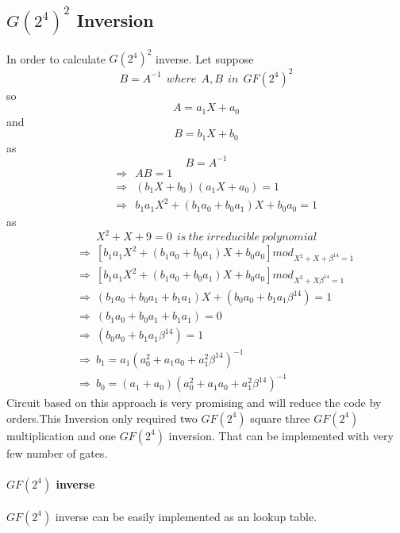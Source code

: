 \documentclass[10pt, conference, compsocconf]{IEEEtran}
\begin{document}
\subsection {$G(2^4)^2$ Inversion}
In order to calculate $G(2^4)^2$ inverse. Let suppose
\begin{equation}
B =  A^{-1}~~ where~~ A,B~~  in ~~GF(2^4)^2
\end{equation}
so
\begin{equation}
A = a_1 X + a_0
\end{equation}
and
\begin{equation}
B = b_1 X + b_0
\end{equation}
as
\begin{equation}
B = A^{-1}
\end{equation}
\begin{eqnarray}
&&\Rightarrow ~~AB = 1 \nonumber\\
&&\Rightarrow ~~(b_1 X + b_0)(a_1 X + a_0) = 1 \nonumber\\
&&\Rightarrow ~~b_1 a_1 X^2 + (b_1 a_0+b_0 a_1)X + b_0 a_0 = 1
\end{eqnarray}
as
\begin{equation}
X^2 + X + 9 = 0 ~~is~ the~ irreducible~ polynomial \nonumber
\end{equation}
\begin{eqnarray}
&&\Rightarrow ~[b_1 a_1 X^2 + (b_1 a_0+b_0 a_1)X + b_0 a_0] mod_{X^2 + X + \beta^{14} = 1} \nonumber\\
&&\Rightarrow ~[b_1 a_1 X^2 + (b_1 a_0+b_0 a_1)X + b_0 a_0] mod_{X^2 + X  \beta^{14} = 1} \nonumber\\
&&\Rightarrow ~(b_1 a_0+b_0 a_1 + b_1 a_1)X + (b_0 a_0 + b_1 a_1 \beta^{14} )= 1 \nonumber\\
&&\Rightarrow ~(b_1 a_0+b_0 a_1 + b_1 a_1)= 0  \nonumber\\
&&\Rightarrow ~(b_0 a_0 + b_1 a_1 \beta^{14} )= 1  \nonumber\\
&&\Rightarrow ~b_1 = a_1 (a_0^2 + a_1 a_0 +a_1^2 \beta^{14} )^{-1}  \\
&&\Rightarrow ~b_0 = (a_1 + a_0) (a_0^2 + a_1 a_0 +a_1^2 \beta^{14} )^{-1}
\end{eqnarray}
Circuit based on this approach is very promising and will reduce the code by orders.This Inversion only required  two $GF(2^4)$ square three $GF(2^4)$ multiplication and one $GF(2^4)$ inversion. That can be implemented with very few number of gates.

\paragraph{$GF(2^4)$ inverse}
$GF(2^4)$ inverse can be easily implemented as an lookup table.
\end{document}

